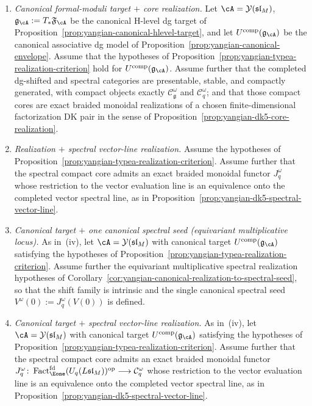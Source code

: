 \begin{theorem}
\begin{enumerate}[label=\textup{(\roman*)}]
\item\emph{Canonical formal-moduli target $+$ core realization.}
 Let $\cA=\mathcal{Y}(\mathfrak{sl}_M)$,
 $\mathfrak{g}_{\cA}:=T_*\mathfrak{F}_{\cA}$ be the canonical
 H-level dg target of
 Proposition~\ref{prop:yangian-canonical-hlevel-target}, and let
 $U^{\mathrm{comp}}(\mathfrak{g}_{\cA})$ be the canonical associative
 dg model of Proposition~\ref{prop:yangian-canonical-envelope}.
 Assume that the hypotheses of
 Proposition~\ref{prop:yangian-typea-realization-criterion} hold for
 $U^{\mathrm{comp}}(\mathfrak{g}_{\cA})$. Assume further that the
 completed dg-shifted and spectral categories are presentable, stable,
 and compactly generated, with compact objects exactly
 $\mathcal{C}_{\mathfrak g}^\omega$ and $\mathcal{C}_q^\omega$; and
 that those compact cores are exact braided monoidal realizations of
 a chosen finite-dimensional factorization DK pair in the sense of
 Proposition~\ref{prop:yangian-dk5-core-realization}.

\item\emph{Realization $+$ spectral vector-line realization.}
 Assume the hypotheses of
 Proposition~\ref{prop:yangian-typea-realization-criterion}. Assume
 further that the spectral compact core admits an exact braided
 monoidal functor $J_q^\omega$ whose restriction to the vector
 evaluation line is an equivalence onto the completed vector spectral
 line, as in
 Proposition~\ref{prop:yangian-dk5-spectral-vector-line}.

\item\emph{Canonical target $+$ one canonical spectral seed
 (equivariant multiplicative locus).}
 As in~\textup{(iv)}, let $\cA=\mathcal{Y}(\mathfrak{sl}_M)$ with
 canonical target
 $U^{\mathrm{comp}}(\mathfrak{g}_{\cA})$ satisfying the hypotheses of
 Proposition~\ref{prop:yangian-typea-realization-criterion}. Assume
 further the equivariant multiplicative spectral realization
 hypotheses of
 Corollary~\ref{cor:yangian-canonical-realization-to-spectral-seed},
 so that the shift family is intrinsic and the single canonical
 spectral seed $V^\omega(0):=J_q^\omega(V(0))$ is defined.

\item\emph{Canonical target $+$ spectral vector-line realization.}
 As in~\textup{(iv)}, let $\cA=\mathcal{Y}(\mathfrak{sl}_M)$ with
 canonical target
 $U^{\mathrm{comp}}(\mathfrak{g}_{\cA})$ satisfying the hypotheses of
 Proposition~\ref{prop:yangian-typea-realization-criterion}. Assume
 further that the spectral compact core admits an exact braided
 monoidal functor
 \(J_q^\omega\colon
 \operatorname{Fact}_{\Eone}^{\mathrm{fd}}(U_q(L\mathfrak{sl}_M))^{\mathrm{op}}
 \longrightarrow \mathcal C_q^\omega\)
 whose restriction to the vector evaluation line is an equivalence
 onto the completed vector spectral line, as in
 Proposition~\ref{prop:yangian-dk5-spectral-vector-line}.
\end{enumerate}
\end{theorem}

